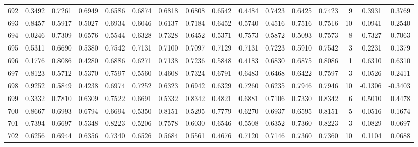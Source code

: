 \begin{tabular}{lrrrrrrrrrrrrrrr}
692 &      0.3492 &  0.7261 &  0.6949 &  0.6586 &  0.6874 &  0.6818 &  0.6808 &  0.6542 &  0.4484 &  0.7423 &   0.6425 &     0.7423 &      9 &                    0.3931 &                     0.3769 \\
693 &      0.8457 &  0.5917 &  0.5027 &  0.6934 &  0.6046 &  0.6137 &  0.7184 &  0.6452 &  0.5740 &  0.4516 &   0.7516 &     0.7516 &     10 &                   -0.0941 &                    -0.2540 \\
694 &      0.0246 &  0.7309 &  0.6576 &  0.5544 &  0.6328 &  0.7328 &  0.6452 &  0.5371 &  0.7573 &  0.5872 &   0.5093 &     0.7573 &      8 &                    0.7327 &                     0.7063 \\
695 &      0.5311 &  0.6690 &  0.5380 &  0.7542 &  0.7131 &  0.7100 &  0.7097 &  0.7129 &  0.7131 &  0.7223 &   0.5910 &     0.7542 &      3 &                    0.2231 &                     0.1379 \\
696 &      0.1776 &  0.8086 &  0.4280 &  0.6886 &  0.6271 &  0.7138 &  0.7236 &  0.5848 &  0.4183 &  0.6830 &   0.6875 &     0.8086 &      1 &                    0.6310 &                     0.6310 \\
697 &      0.8123 &  0.5712 &  0.5370 &  0.7597 &  0.5560 &  0.4608 &  0.7324 &  0.6791 &  0.6483 &  0.6468 &   0.6422 &     0.7597 &      3 &                   -0.0526 &                    -0.2411 \\
698 &      0.9252 &  0.5849 &  0.4238 &  0.6974 &  0.7252 &  0.6323 &  0.6942 &  0.6329 &  0.7260 &  0.6235 &   0.7946 &     0.7946 &     10 &                   -0.1306 &                    -0.3403 \\
699 &      0.3332 &  0.7810 &  0.6309 &  0.7522 &  0.6691 &  0.5332 &  0.8342 &  0.4821 &  0.6881 &  0.7106 &   0.7330 &     0.8342 &      6 &                    0.5010 &                     0.4478 \\
700 &      0.8667 &  0.6993 &  0.6794 &  0.6694 &  0.5350 &  0.8151 &  0.5295 &  0.7779 &  0.6270 &  0.6937 &   0.6595 &     0.8151 &      5 &                   -0.0516 &                    -0.1674 \\
701 &      0.7394 &  0.6697 &  0.5348 &  0.8223 &  0.5206 &  0.7578 &  0.6030 &  0.6546 &  0.5508 &  0.6352 &   0.7360 &     0.8223 &      3 &                    0.0829 &                    -0.0697 \\
702 &      0.6256 &  0.6944 &  0.6356 &  0.7340 &  0.6526 &  0.5684 &  0.5561 &  0.4676 &  0.7120 &  0.7146 &   0.7360 &     0.7360 &     10 &                    0.1104 &                     0.0688 \\

\end{tabular}
